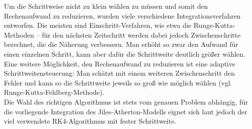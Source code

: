 \documentclass{scrartcl}
\begin{document}
Um die Schrittweise nicht zu klein wählen zu müssen und somit den Rechenaufwand zu reduzieren, wurden viele verschiedene Integrationsverfahren entworfen. Die meisten sind Einschritt-Verfahren, wie etwa die Runge-Kutta-Methoden -- für den nächsten Zeitschritt werden dabei jedoch Zwischenschritte berechnet, die die Näherung verbessern. Man erhöht so zwar den Aufwand für einen einzelnen Schritt, kann aber dafür die Schrittweite deutlich größer wählen.\\
Eine weitere Möglichkeit, den Rechenaufwand zu reduzieren ist eine adaptive Schrittweitensteuerung: Man schätzt mit einem weiteren Zwischenschritt den Fehler und kann so die Schrittweite jeweils so groß wie möglich wählen (vgl. Runge-Kutta-Fehlberg-Methode).\\
Die Wahl des richtigen Algorithmus ist stets vom genauen Problem abhängig, für die vorliegende Integration des Jiles-Atherton-Modells eignet sich laut \cite{ja-rk} jedoch der viel verwendete RK4-Algorithmus mit fester Schrittweite.
\end{document}
